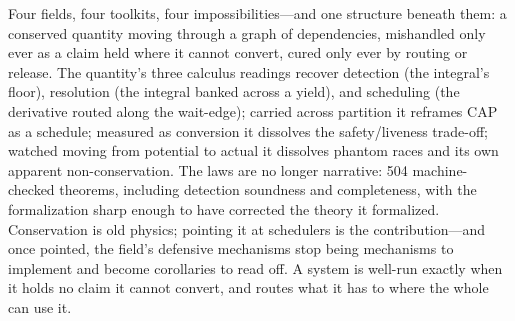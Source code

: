 \documentclass[11pt]{article}
\begin{document}
Four fields, four toolkits, four impossibilities---and one structure
beneath them: a conserved quantity moving through a graph of
dependencies, mishandled only ever as a claim held where it cannot
convert, cured only ever by routing or release. The quantity's three
calculus readings recover detection (the integral's floor), resolution
(the integral banked across a yield), and scheduling (the derivative
routed along the wait-edge); carried across partition it reframes CAP
as a schedule; measured as conversion it dissolves the safety/liveness
trade-off; watched moving from potential to actual it dissolves phantom
races and its own apparent non-conservation. The laws are no longer
narrative: 504 machine-checked theorems, including detection soundness
and completeness,
with the formalization sharp enough to have corrected the theory it
formalized. Conservation is old physics; pointing it at schedulers is
the contribution---and once pointed, the field's defensive mechanisms
stop being mechanisms to implement and become corollaries to read off.
A system is well-run exactly when it holds no claim it cannot convert,
and routes what it has to where the whole can use it.
\end{document}
